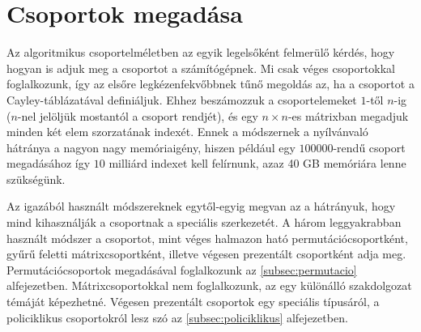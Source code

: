 \section{Csoportok megadása}
\label{sec:csoport}
Az algoritmikus csoportelméletben az egyik legelsőként felmerülő kérdés, hogy hogyan is adjuk meg
a csoportot a számítógépnek.
Mi csak véges csoportokkal foglalkozunk, így az elsőre legkézenfekvőbbnek tűnő megoldás az, ha a
csoportot a Cayley-táblázatával definiáljuk.
Ehhez beszámozzuk a csoportelemeket $1$-től $n$-ig ($n$-nel jelöljük mostantól a csoport rendjét),
és egy $n\times n$-es mátrixban megadjuk minden két elem szorzatának indexét.
Ennek a módszernek a nyílvánvaló hátránya a nagyon nagy memóriaigény,
hiszen például egy $100000$-rendű csoport megadásához így $10$ milliárd indexet kell felírnunk,
azaz 40 GB memóriára lenne szükségünk.

Az igazából használt módszereknek egytől-egyig megvan az a hátrányuk, hogy mind kihasználják
a csoportnak a speciális szerkezetét.
A három leggyakrabban használt módszer a csoportot, mint véges halmazon ható permutációcsoportként,
gyűrű feletti mátrixcsoportként, illetve végesen prezentált csoportként adja meg.
Permutációcsoportok megadásával foglalkozunk az \ref{subsec:permutacio} alfejezetben.
Mátrixcsoportokkal nem foglalkozunk, az egy különálló szakdolgozat témáját képezhetné.
Végesen prezentált csoportok egy speciális típusáról, a policiklikus csoportokról lesz szó
az \ref{subsec:policiklikus} alfejezetben.




\clearpage
